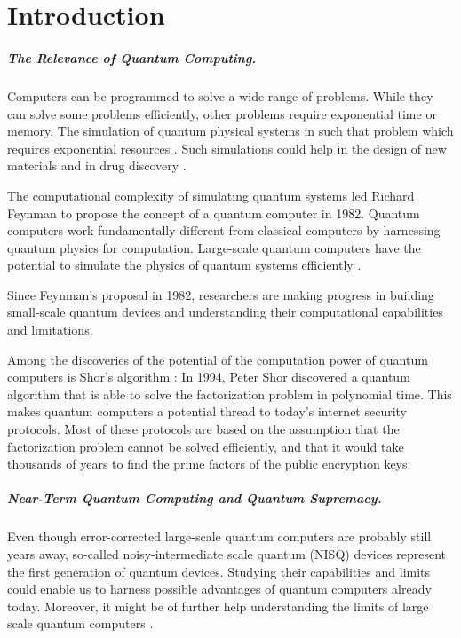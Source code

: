 \chapter{Introduction}

\paragraph{The Relevance of Quantum Computing.}
Computers can be programmed to solve a wide range of problems.
While they can solve some problems efficiently, 
other problems require exponential time or memory. The simulation 
of quantum physical systems in such that problem which requires 
exponential resources \cite{nielsen2002quantum}.  
Such simulations could help in the design 
of new materials and in drug discovery \cite{8585034}.

The computational complexity of simulating quantum systems led 
Richard Feynman to propose the concept of a quantum computer \cite{feynman1982simulating} in 1982. 
Quantum computers work fundamentally different from classical computers by 
harnessing quantum physics for computation. Large-scale quantum computers have the potential
to simulate the physics of quantum systems efficiently \cite{Zalka_1998}.

Since Feynman's proposal in 1982, researchers are making progress in building small-scale 
quantum devices and understanding their computational capabilities and limitations.

Among the discoveries of the potential of the computation power of quantum computers is Shor's algorithm \cite{shor1997factorisation}: 
In 1994, Peter Shor discovered a quantum algorithm that is able to solve the 
factorization problem in polynomial time. This makes quantum computers a potential thread to 
today's internet security protocols. Most of these protocols are based on the assumption 
that the factorization problem cannot be solved efficiently, and that it would take thousands of years to find the 
prime factors of the public encryption keys.

\paragraph{Near-Term Quantum Computing and Quantum Supremacy.}
Even though error-corrected large-scale quantum computers are probably still 
years away, so-called noisy-intermediate scale 
quantum (NISQ) devices represent the first generation of quantum devices.
Studying their capabilities and limits could enable us to harness possible advantages 
of quantum computers already today. Moreover, it might be of further help understanding
the limits of large scale quantum computers \cite{Preskill_2018}.

